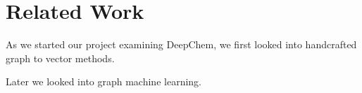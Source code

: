 \section{Related Work}

As we started our project examining DeepChem, we first looked into handcrafted graph to vector methods.

Later we looked into graph machine learning.